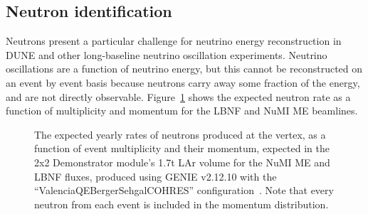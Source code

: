 \subsection{Neutron identification}
Neutrons present a particular challenge for neutrino energy reconstruction in DUNE and other long-baseline neutrino oscillation experiments. Neutrino oscillations are a function of neutrino energy, but this cannot be reconstructed on an event by event basis because neutrons carry away some fraction of the energy, and are not directly observable. Figure~\ref{fig:neutron_kinematics} shows the expected neutron rate as a function of multiplicity and momentum for the LBNF and NuMI ME beamlines.
\begin{figure}[htb]
  \centering
  \caption{The expected yearly rates of neutrons produced at the vertex, as a function of event multiplicity and their momentum, expected in the 2x2 Demonstrator module's 1.7t LAr volume for the NuMI ME and LBNF fluxes, produced using GENIE v2.12.10 with the ``ValenciaQEBergerSehgalCOHRES'' configuration~\cite{genie}. Note that every neutron from each event is included in the momentum distribution.}
  \label{fig:neutron_kinematics}
\end{figure}


